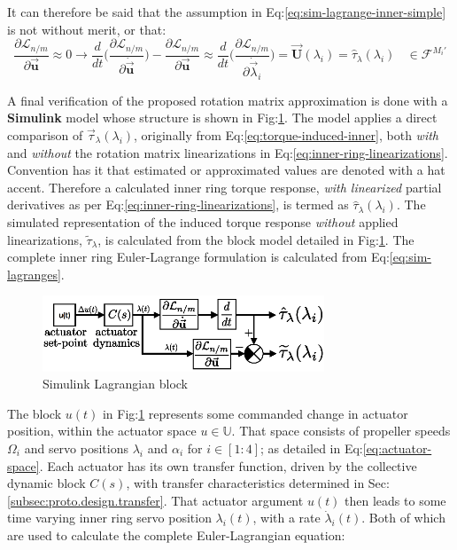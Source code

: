 It can therefore be said that the assumption in Eq:\ref{eq:sim-lagrange-inner-simple} is not without merit, or that:
\begin{equation}
\frac{\partial\mathcal{L}_{n/m}}{\partial\vec{\mathbf{u}}}\approx 0\rightarrow\frac{d}{dt}\bigg(\frac{\partial\mathcal{L}_{n/m}}{\partial\dot{\vec{\mathbf{u}}}}\bigg)-\frac{\partial\mathcal{L}_{n/m}}{\partial\vec{\mathbf{u}}}\approx\frac{d}{dt}\Big(\frac{\partial\mathcal{L}_{n/m}}{\partial\dot{\vec{\lambda}}_i}\Big)=\vec{\mathbf{U}}(\lambda_i)=\hat{\tau}_\lambda(\lambda_i)~~~~\in\mathcal{F}^{M_i'}
\end{equation}
\par
A final verification of the proposed rotation matrix approximation is done with a \textbf{Simulink} model whose structure is shown in Fig:\ref{fig:linear-block}. The model applies a direct comparison of $\vec{\tau}_\lambda(\lambda_i)$, originally from Eq:\ref{eq:torque-induced-inner}, both \emph{with} and \emph{without} the rotation matrix linearizations in Eq:\ref{eq:inner-ring-linearizations}. Convention has it that estimated or approximated values are denoted with a hat accent. Therefore a calculated inner ring torque response, \emph{with linearized} partial derivatives as per Eq:\ref{eq:inner-ring-linearizations}, is termed as $\hat{\tau}_\lambda(\lambda_i)$. The simulated representation of the induced torque response \emph{without} applied linearizations, $\widetilde{\tau}_\lambda$, is calculated from the block model detailed in Fig:\ref{fig:linear-block}. The complete inner ring Euler-Lagrange formulation is calculated from Eq:\ref{eq:sim-lagranges}.
\par
\begin{figure}[htbp]
\vspace{-4pt}
\centering
\includegraphics[width=0.75\textwidth]{figs/linear-block}
\caption{Simulink Lagrangian block}
\label{fig:linear-block}
\vspace{-6pt}
\end{figure}
\par
The block $u(t)$ in Fig:\ref{fig:linear-block} represents some commanded change in actuator position, within the actuator space $u\in\mathbb{U}$. That space consists of propeller speeds $\Omega_i$ and servo positions $\lambda_i$ and $\alpha_i$ for $i\in[1:4]$; as detailed in Eq:\ref{eq:actuator-space}. Each actuator has its own transfer function, driven by the collective dynamic block $C(s)$, with transfer characteristics determined in Sec:\ref{subsec:proto.design.transfer}. That actuator argument $u(t)$ then leads to some time varying inner ring servo position $\lambda_i(t)$, with a rate $\dot{\lambda}_i(t)$. Both of which are used to calculate the complete Euler-Lagrangian equation:
